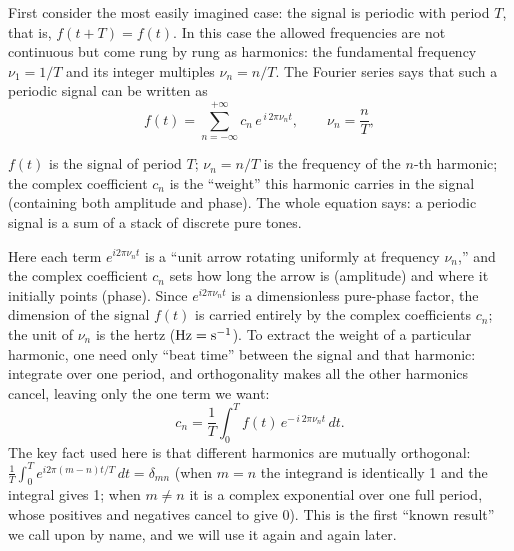 First consider the most easily imagined case: the signal is periodic with period \(T\), that is, \(f(t+T)=f(t)\). In this case the allowed frequencies are not continuous but come rung by rung as harmonics: the fundamental frequency \(\nu_1=1/T\) and its integer multiples \(\nu_n=n/T\). The Fourier series says that such a periodic signal can be written as
\begin{equation}
  f(t)=\sum_{n=-\infty}^{+\infty} c_n\,e^{\,i\,2\pi\nu_n t},
  \qquad
  \nu_n=\frac{n}{T},
  \label{eq:e02-fourier-series}
\end{equation}
\begin{formulaexplain}
\(f(t)\) is the signal of period \(T\); \(\nu_n=n/T\) is the frequency of the \(n\)-th harmonic; the complex coefficient \(c_n\) is the ``weight'' this harmonic carries in the signal (containing both amplitude and phase). The whole equation says: a periodic signal is a sum of a stack of discrete pure tones.
\end{formulaexplain}
Here each term \(e^{i2\pi\nu_n t}\) is a ``unit arrow rotating uniformly at frequency \(\nu_n\),'' and the complex coefficient \(c_n\) sets how long the arrow is (amplitude) and where it initially points (phase). Since \(e^{i2\pi\nu_n t}\) is a dimensionless pure-phase factor, the dimension of the signal \(f(t)\) is carried entirely by the complex coefficients \(c_n\); the unit of \(\nu_n\) is the hertz (\({\rm Hz}={\rm s^{-1}}\)). To extract the weight of a particular harmonic, one need only ``beat time'' between the signal and that harmonic: integrate over one period, and orthogonality makes all the other harmonics cancel, leaving only the one term we want:
\[
  c_n=\frac{1}{T}\int_{0}^{T} f(t)\,e^{-\,i\,2\pi\nu_n t}\,dt .
\]
The key fact used here is that different harmonics are mutually orthogonal: \(\frac{1}{T}\int_0^T e^{i2\pi(m-n)t/T}\,dt=\delta_{mn}\) (when \(m=n\) the integrand is identically 1 and the integral gives 1; when \(m\neq n\) it is a complex exponential over one full period, whose positives and negatives cancel to give 0). This is the first ``known result'' we call upon by name, and we will use it again and again later.

